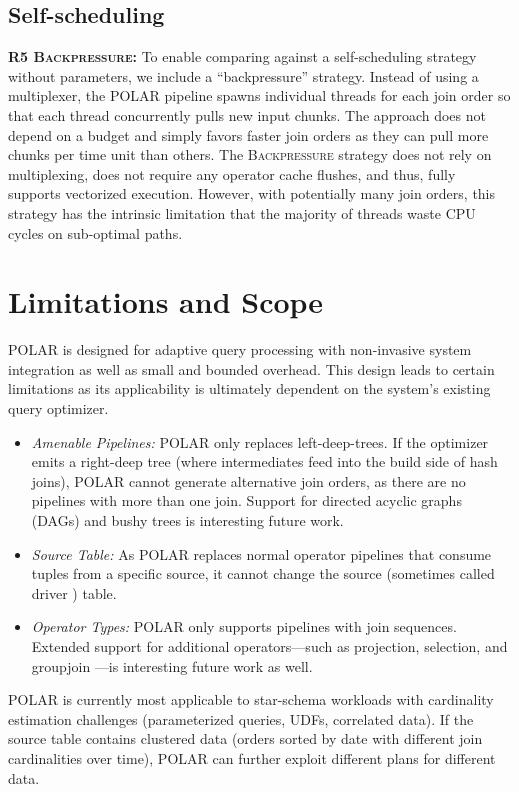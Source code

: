\subsection{Self-scheduling}\label{sec:backpressure}

\textbf{R5 \textsc{Backpressure}:} To enable comparing against a self-scheduling strategy without parameters, we include a \enquote{backpressure} strategy. Instead of using a multiplexer, the POLAR pipeline spawns individual threads for each join order so that each thread concurrently pulls new input chunks. The approach does not depend on a budget and simply favors faster join orders as they can pull more chunks per time unit than others. The \textsc{Backpressure} strategy does not rely on multiplexing, does not require any operator cache flushes, and thus, fully supports vectorized execution. However, with potentially many join orders, this strategy has the intrinsic limitation that the majority of threads waste CPU cycles on sub-optimal paths.


\section{Limitations and Scope}
\label{sec:limits}
%
POLAR is designed for adaptive query processing with non-invasive system integration as well as small and bounded overhead. This design leads to certain limitations as its applicability is ultimately dependent on the system's existing query optimizer. 
\begin{itemize}
\item \emph{Amenable Pipelines:} POLAR only replaces left-deep-trees. If the optimizer emits a right-deep tree (where intermediates feed into the build side of hash joins), POLAR cannot generate alternative join orders, as there are no pipelines with more than one join. Support for directed acyclic graphs (DAGs) and bushy trees is interesting future work.
\item \emph{Source Table:} As POLAR replaces normal operator pipelines that consume tuples from a specific source, it cannot change the source (sometimes called driver \cite{LiSMBCL07}) table.
\item \emph{Operator Types:} POLAR only supports pipelines with join sequences. Extended support for additional operators---such as projection, selection, and groupjoin \cite{MoerkotteN11}---is interesting future work as well.
\end{itemize}
%
POLAR is currently most applicable to star-schema workloads with cardinality estimation challenges (\eg parameterized queries, UDFs, correlated data). If the source table contains clustered data (\eg orders sorted by date with different join cardinalities over time), POLAR can further exploit different plans for different data.